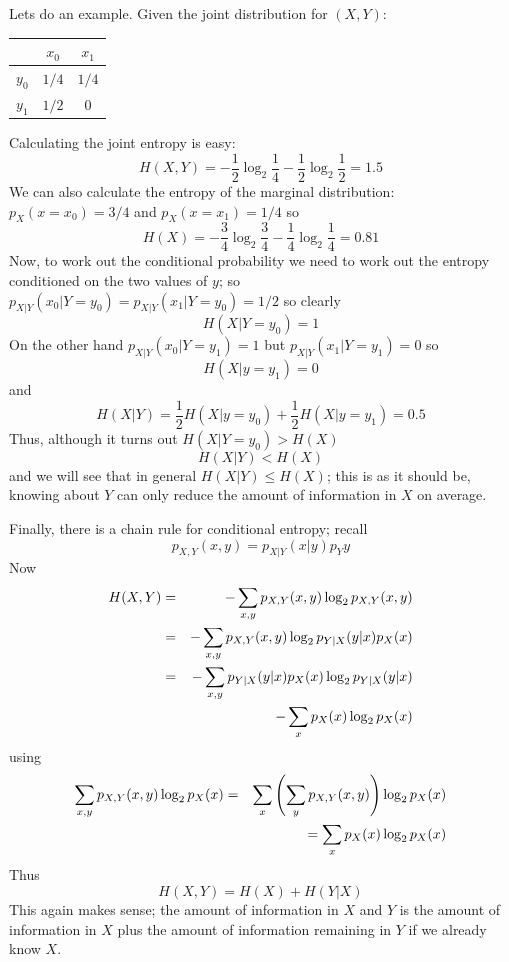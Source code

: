 \documentclass[12pt]{article}
\begin{document}
Lets do an example. Given the joint distribution for $(X,Y)$:
\begin{center}
\begin{tabular}{c|cc}
&$x_0$&$x_1$\\
\hline
$y_0$&$1/4$&$1/4$\\
$y_1$&$1/2$&$0$
\end{tabular}
\end{center}
Calculating the joint entropy is easy:
\begin{equation}
H(X,Y)=-\frac{1}{2}\log_2{\frac{1}{4}}-\frac{1}{2}\log_2{\frac{1}{2}}=1.5
\end{equation}
We can also calculate the entropy of the marginal distribution: $p_X(x=x_0)=3/4$ and $p_X(x=x_1)=1/4$ so
\begin{equation}
H(X)=-\frac{3}{4}\log_2{\frac{3}{4}}-\frac{1}{4}\log_2{\frac{1}{4}}=0.81
\end{equation}
Now, to work out the conditional probability we need to work out the entropy conditioned on the two values of $y$; so $p_{X|Y}(x_0|Y=y_0)=p_{X|Y}(x_1|Y=y_0)=1/2$ so clearly
\begin{equation}
H(X|Y=y_0)=1
\end{equation}
On the other hand $p_{X|Y}(x_0|Y=y_1)=1$ but $p_{X|Y}(x_1|Y=y_1)=0$ so
\begin{equation}
H(X|y=y_1)=0
\end{equation}
and
\begin{equation}
H(X|Y)=\frac{1}{2}H(X|y=y_0)+\frac{1}{2}H(X|y=y_1)=0.5
\end{equation}
Thus, although it turns out $H(X|Y=y_0)>H(X)$
\begin{equation}
H(X|Y)<H(X)
\end{equation}
and we will see that in general $H(X|Y)\le H(X)$; this is as it should
be, knowing about $Y$ can only reduce the amount of information in $X$
on average.

Finally, there is a chain rule for conditional entropy; recall
\begin{equation}
p_{X,Y}(x,y)=p_{X|Y}(x|y)p_Y{y}
\end{equation}
Now
\begin{eqnarray}
H(X,Y)&=&-\sum_{x,y} p_{X,Y}(x,y)\log_2{p_{X,Y}(x,y)}\cr
&=&-\sum_{x,y} p_{X,Y}(x,y)\log_2{p_{Y|X}(y|x)p_X(x)}\cr
&=&-\sum_{x,y} p_{Y|X}(y|x)p_X(x)\log_2{p_{Y|X}(y|x)}\cr&&-\sum_x p_{X}(x)\log_2{p_X(x)}
\end{eqnarray}
using
\begin{eqnarray}
\sum_{x,y}p_{X,Y}(x,y)\log_2{p_X(x)}&=&\sum_{x}\left(\sum_y p_{X,Y}(x,y)\right)\log_2{p_X(x)}\cr &&=\sum_x p_{X}(x)\log_2{p_X(x)}
\end{eqnarray}
Thus
\begin{equation}
H(X,Y)=H(X)+H(Y|X)
\end{equation}
This again makes sense; the amount of information in $X$ and $Y$ is
the amount of information in $X$ plus the amount of information
remaining in $Y$ if we already know $X$.
\end{document}
